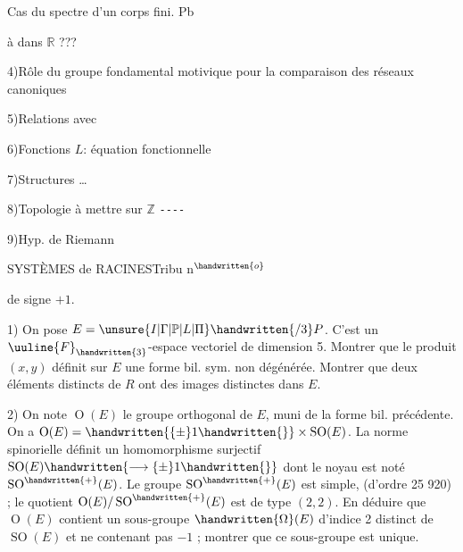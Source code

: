Cas du spectre d'un corps fini. Pb 

 à  dans $\mathbb{R}$ ???

\margin{*}
4)\quad Rôle du groupe fondamental motivique pour la comparaison des réseaux canoniques

5)\quad Relations  avec   

6)\quad Fonctions $L$: équation fonctionnelle

7)\quad Structures \ldots

8)\quad Topologie à mettre sur $\mathbb{Z}$ \texttt{-{}-{}-{}-}

9)\quad Hyp. de Riemann 


SYSTÈMES de RACINES\hfill Tribu n$^{\handwritten{o}}$ 

de signe $+1$.

1) On pose $E=\unsure{I|\Gamma|\mathbb{P}|L|\Pi}\handwritten{/3}P$. C'est un $\uuline{F}_{\handwritten{3}}$-espace vectoriel de dimension 5. Montrer que le produit $(x,y)$ définit sur $E$ une forme bil. sym. non dégénérée. Montrer que deux éléments distincts de $R$ ont des images distinctes dans $E$.

2) On note $\operatorname{O}(E)$ le groupe orthogonal de $E$, muni de la forme bil. précédente. On a $\operatorname{O}(E)=\handwritten{\{\pm}1\handwritten{\}}\times\operatorname{SO}(E)$. La norme spinorielle définit un homomorphisme surjectif $\operatorname{SO}(E)\handwritten{\longrightarrow\{\pm}1\handwritten{\}}$ dont le noyau est noté $\operatorname{SO}^{\handwritten{+}}(E)$. Le groupe $\operatorname{SO}^{\handwritten{+}}(E)$ est simple, (d'ordre 25 920) ; le quotient $\operatorname{O}(E)/\operatorname{SO}^{\handwritten{+}}(E)$ est de type $(2,2)$. En déduire que $\operatorname{O}(E)$ contient un sous-groupe $\handwritten{\Omega}(E)$ d'indice 2 distinct de $\operatorname{SO}(E)$ et ne contenant pas $-1$ ; montrer que ce sous-groupe est unique.

